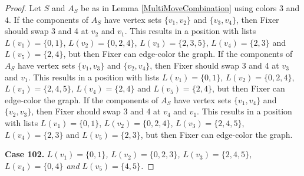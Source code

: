 \documentclass[12pt]{amsart}
\theoremstyle{plain}
\theoremstyle{definition}
\theoremstyle{remark}
\begin{document}
\begin{proof}
Let $S$ and $A_S$ be as in Lemma \ref{MultiMoveCombination} using colors $3$ and $4$. If the components of $A_S$ have vertex sets $\{v_1, v_2\}$ and $\{v_3, v_4\}$, then Fixer should swap 3 and 4 at $v_2$ and $v_1$. This results in a position with lists $L(v_1) = \{0, 1\}$, $L(v_2) = \{0, 2, 4\}$, $L(v_3) = \{2, 3, 5\}$, $L(v_4) = \{2, 3\}$ and $L(v_5) = \{2, 4\}$, but then Fixer can edge-color the graph.
If the components of $A_S$ have vertex sets $\{v_1, v_3\}$ and $\{v_2, v_4\}$, then Fixer should swap 3 and 4 at $v_3$ and $v_1$. This results in a position with lists $L(v_1) = \{0, 1\}$, $L(v_2) = \{0, 2, 4\}$, $L(v_3) = \{2, 4, 5\}$, $L(v_4) = \{2, 4\}$ and $L(v_5) = \{2, 4\}$, but then Fixer can edge-color the graph.
If the components of $A_S$ have vertex sets $\{v_1, v_4\}$ and $\{v_2, v_3\}$, then Fixer should swap 3 and 4 at $v_4$ and $v_1$. This results in a position with lists $L(v_1) = \{0, 1\}$, $L(v_2) = \{0, 2, 4\}$, $L(v_3) = \{2, 4, 5\}$, $L(v_4) = \{2, 3\}$ and $L(v_5) = \{2, 3\}$, but then Fixer can edge-color the graph.

\noindent\textbf{Case 102.  }\textit{$L(v_1) = \{0, 1\}$, $L(v_2) = \{0, 2, 3\}$, $L(v_3) = \{2, 4, 5\}$, $L(v_4) = \{0, 4\}$ and $L(v_5) = \{4, 5\}$.}


\end{proof}
\end{document}
